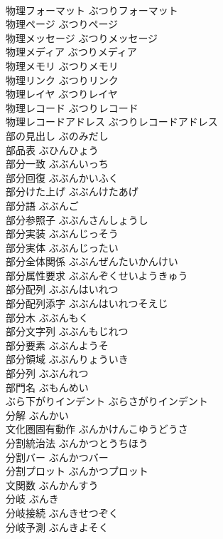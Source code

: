 \documentclass[8pt]{extreport}
\begin{document}
\begin{CJK}{UTF8}{min}
\\	物理フォーマット	ぶつりフォーマット	
\\	物理ページ	ぶつりページ	
\\	物理メッセージ	ぶつりメッセージ	
\\	物理メディア	ぶつりメディア	
\\	物理メモリ	ぶつりメモリ	
\\	物理リンク	ぶつりリンク	
\\	物理レイヤ	ぶつりレイヤ	
\\	物理レコード	ぶつりレコード	
\\	物理レコードアドレス	ぶつりレコードアドレス	
\\	部の見出し	ぶのみだし	
\\	部品表	ぶひんひょう	
\\	部分一致	ぶぶんいっち	
\\	部分回復	ぶぶんかいふく	
\\	部分けた上げ	ぶぶんけたあげ	
\\	部分語	ぶぶんご	
\\	部分参照子	ぶぶんさんしょうし	
\\	部分実装	ぶぶんじっそう	
\\	部分実体	ぶぶんじったい	
\\	部分全体関係	ぶぶんぜんたいかんけい	
\\	部分属性要求	ぶぶんぞくせいようきゅう	
\\	部分配列	ぶぶんはいれつ	
\\	部分配列添字	ぶぶんはいれつそえじ	
\\	部分木	ぶぶんもく	
\\	部分文字列	ぶぶんもじれつ	
\\	部分要素	ぶぶんようそ	
\\	部分領域	ぶぶんりょういき	
\\	部分列	ぶぶんれつ	
\\	部門名	ぶもんめい	
\\	ぶら下がりインデント	ぶらさがりインデント	
\\	分解	ぶんかい	
\\	文化圏固有動作	ぶんかけんこゆうどうさ	
\\	分割統治法	ぶんかつとうちほう	
\\	分割バー	ぶんかつバー	
\\	分割プロット	ぶんかつプロット	
\\	文関数	ぶんかんすう	
\\	分岐	ぶんき	
\\	分岐接続	ぶんきせつぞく	
\\	分岐予測	ぶんきよそく	

\end{CJK}
\end{document}
